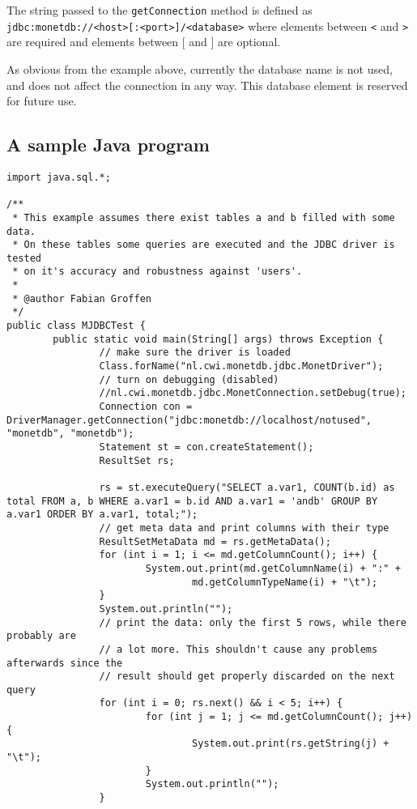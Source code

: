 \documentclass{article}
\begin{document}
The string passed to the \verb"getConnection" method is defined as
\verb"jdbc:monetdb://<host>[:<port>]/<database>" where elements between
\verb"<" and \verb">" are required and elements between [ and ] are optional.

As obvious from the example above, currently the database name is not used, and does not affect
the connection in any way. This database element is reserved for future use.

\subsection{A sample Java program}
\begin{verbatim}
import java.sql.*;

/**
 * This example assumes there exist tables a and b filled with some data.
 * On these tables some queries are executed and the JDBC driver is tested
 * on it's accuracy and robustness against 'users'.
 *
 * @author Fabian Groffen
 */
public class MJDBCTest {
        public static void main(String[] args) throws Exception {
                // make sure the driver is loaded
                Class.forName("nl.cwi.monetdb.jdbc.MonetDriver");
                // turn on debugging (disabled)
                //nl.cwi.monetdb.jdbc.MonetConnection.setDebug(true);
                Connection con = DriverManager.getConnection("jdbc:monetdb://localhost/notused", "monetdb", "monetdb");
                Statement st = con.createStatement();
                ResultSet rs;

                rs = st.executeQuery("SELECT a.var1, COUNT(b.id) as total FROM a, b WHERE a.var1 = b.id AND a.var1 = 'andb' GROUP BY a.var1 ORDER BY a.var1, total;");
                // get meta data and print columns with their type
                ResultSetMetaData md = rs.getMetaData();
                for (int i = 1; i <= md.getColumnCount(); i++) {
                        System.out.print(md.getColumnName(i) + ":" +
                                md.getColumnTypeName(i) + "\t");
                }
                System.out.println("");
                // print the data: only the first 5 rows, while there probably are
                // a lot more. This shouldn't cause any problems afterwards since the
                // result should get properly discarded on the next query
                for (int i = 0; rs.next() && i < 5; i++) {
                        for (int j = 1; j <= md.getColumnCount(); j++) {
                                System.out.print(rs.getString(j) + "\t");
                        }
                        System.out.println("");
                }
                

\end{verbatim}
\end{document}
